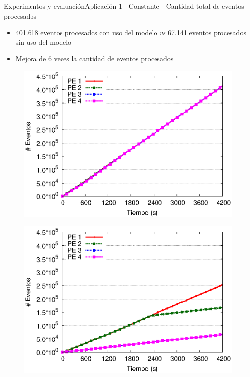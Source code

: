 \begin{frame}{Experimentos y evaluación}{Aplicación 1 - Constante - Cantidad total de eventos procesados}

\begin{itemize}
\item 401.618 eventos procesados con uso del modelo \textit{vs} 67.141 eventos procesados sin uso del modelo
\item Mejora de 6 veces la cantidad de eventos procesados
\end{itemize}

\begin{multicols}{2}
\begin{figure}[p]
	\centering
	\includegraphics[scale=0.475]{images/exp/app1/uniform/cm/eventCount.eps}
\end{figure}

\begin{figure}[p]
	\centering
	\includegraphics[scale=0.475]{images/exp/app1/uniform/sm/eventCount.eps}
\end{figure}
\end{multicols}
\end{frame}


